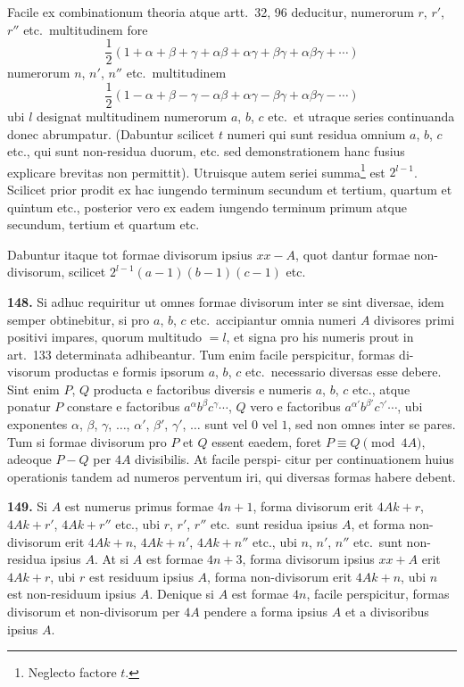 \documentclass[12pt,a4paper]{article}
\begin{document}
Facile ex combinationum theoria atque artt.~32, 96 deducitur, numerorum
$r$, $r'$, $r''$ etc.\ multitudinem fore
\[
\frac{1}{2}(1 + \alpha + \beta + \gamma + \alpha\beta + \alpha\gamma + \beta\gamma + \alpha\beta\gamma + \cdots)
\]
numerorum $n$, $n'$, $n''$ etc.\ multitudinem
\[
\frac{1}{2}(1 - \alpha + \beta - \gamma - \alpha\beta + \alpha\gamma - \beta\gamma + \alpha\beta\gamma - \cdots)
\]
ubi $l$ designat multitudinem numerorum $a$, $b$, $c$ etc.\ et utraque series continuanda donec abrumpatur. (Dabuntur scilicet $t$ numeri
qui sunt residua omnium $a$, $b$, $c$ etc., qui sunt non-residua duorum, etc. sed demonstrationem hanc fusius explicare brevitas non permittit). Utruisque
autem seriei summa\footnote{Neglecto factore $t$.} est $2^{l-1}$. Scilicet prior prodit ex hac
iungendo terminum secundum et tertium, quartum et quintum etc., posterior vero
ex eadem iungendo terminum primum atque secundum, tertium et quartum etc.

Dabuntur itaque tot formae divisorum ipsius $xx - A$, quot dantur formae non-
divisorum, scilicet $2^{l-1}(a-1)(b-1)(c-1)$ etc.

\textbf{148.}
Si adhuc requiritur ut omnes formae divisorum inter se sint diversae,
idem semper obtinebitur, si pro $a$, $b$, $c$ etc.\ accipiantur omnia numeri $A$ divisores
primi positivi impares, quorum multitudo $= l$, et signa pro his numeris prout
in art.~133 determinata adhibeantur. Tum enim facile perspicitur, formas di-
visorum productas e formis ipsorum $a$, $b$, $c$ etc.\ necessario diversas esse debere.
Sint enim $P$, $Q$ producta e factoribus diversis e numeris $a$, $b$, $c$ etc., atque
ponatur $P$ constare e factoribus $a^{\alpha} b^{\beta} c^{\gamma} \cdots$, $Q$ vero e factoribus
$a^{\alpha'} b^{\beta'} c^{\gamma'} \cdots$, ubi exponentes $\alpha$, $\beta$, $\gamma$, $\ldots$, $\alpha'$, $\beta'$, $\gamma'$, $\ldots$ sunt vel $0$ vel $1$,
sed non omnes inter se pares. Tum si formae divisorum pro $P$ et $Q$ essent eaedem,
foret $P \equiv Q \pmod{4A}$, adeoque $P - Q$ per $4A$ divisibilis. At facile perspi-
citur per continuationem huius operationis tandem ad numeros perventum iri,
qui diversas formas habere debent.

\textbf{149.}
Si $A$ est numerus primus formae $4n+1$, forma divisorum erit
$4Ak + r$, $4Ak + r'$, $4Ak + r''$ etc., ubi $r$, $r'$, $r''$ etc.\ sunt residua ipsius
$A$, et forma non-divisorum erit $4Ak + n$, $4Ak + n'$, $4Ak + n''$ etc., ubi
$n$, $n'$, $n''$ etc.\ sunt non-residua ipsius $A$. At si $A$ est formae $4n+3$,
forma divisorum ipsius $xx + A$ erit $4Ak + r$, ubi $r$ est residuum ipsius $A$,
forma non-divisorum erit $4Ak + n$, ubi $n$ est non-residuum ipsius $A$. Denique
si $A$ est formae $4n$, facile perspicitur, formas divisorum et non-divisorum per
$4A$ pendere a forma ipsius $A$ et a divisoribus ipsius $A$.
\end{document}
